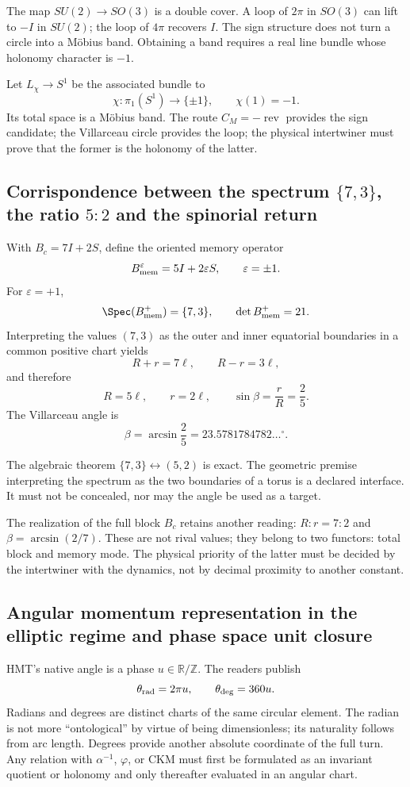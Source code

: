 The map \(SU(2)\to SO(3)\) is a double cover. A loop of
\(2\pi\) in \(SO(3)\) can lift to \(-I\) in \(SU(2)\); the loop of
\(4\pi\) recovers \(I\). The sign structure does not turn a circle into a
Möbius band. Obtaining a band requires a real line bundle
whose holonomy character is \(-1\).

Let \(L_\chi\to S^1\) be the associated bundle to
\[
\chi:\pi_1(S^1)\longrightarrow\{\pm1\},
\qquad \chi(1)=-1.
\]
Its total space is a Möbius band. The route \(C_M=-\operatorname{rev}\)
provides the sign candidate; the Villarceau circle provides the loop; the
physical intertwiner must prove that the former is the holonomy of the latter.

\subsection{Corrispondence between the spectrum \texorpdfstring{\(\{7,3\}\)}{{7,3}}, the ratio \texorpdfstring{\(5{:}2\)}{5:2} and the spinorial return}

With \(B_c=7I+2S\), define the oriented memory operator
\[
B_{\rm mem}^{\varepsilon}=5I+2\varepsilon S,
\qquad\varepsilon=\pm1.
\]
For \(\varepsilon=+1\),
\[
\Spec(B_{\rm mem}^{+})=\{7,3\},
\qquad\det B_{\rm mem}^{+}=21.
\]
Interpreting the values \((7,3)\) as the outer and inner equatorial boundaries
in a common positive chart yields
\[
R+r=7\ell,\qquad R-r=3\ell,
\]
and therefore
\[
R=5\ell,\qquad r=2\ell,\qquad
\sin\beta=\frac rR=\frac25.
\]
The Villarceau angle is
\[
\beta=\arcsin\frac25
=23.5781784782\ldots^\circ.
\]

The algebraic theorem \(\{7,3\}\leftrightarrow(5,2)\) is exact. The geometric
premise interpreting the spectrum as the two boundaries of a torus is a
declared interface. It must not be concealed, nor may the angle be used as a target.

The realization of the full block \(B_c\) retains another reading:
\(R:r=7:2\) and \(\beta=\arcsin(2/7)\). These are not rival values; they belong to
two functors: total block and memory mode. The physical priority of the latter
must be decided by the intertwiner with the dynamics, not by decimal proximity to
another constant.

\subsection{Angular momentum representation in the elliptic regime and phase space unit closure}

HMT’s native angle is a phase \(u\in\mathbb R/\mathbb Z\). The readers
publish
\[
\theta_{\rm rad}=2\pi u,
\qquad
\theta_{\rm deg}=360u.
\]
Radians and degrees are distinct charts of the same circular element. The radian is not more “ontological” by virtue of being dimensionless; its naturality follows from arc length. Degrees provide another absolute coordinate of the full turn. Any relation with \(\alpha^{-1}\), \(\varphi\), or CKM must first be formulated as an invariant quotient or holonomy and only thereafter evaluated in an angular chart.

